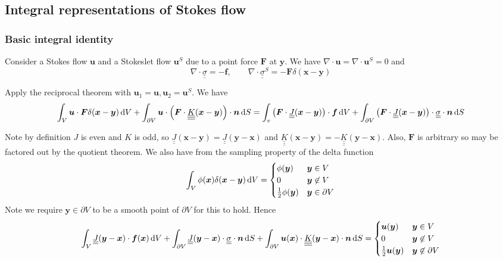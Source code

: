 \documentclass{jknotes}
\newcommand{\dunder}[1]{\underline{\underline{#1}}}
\newcommand{\x}{\bm{x}}
\renewcommand{\u}{\bm{u}}
\newcommand{\y}{\bm{y}}
\begin{document}
\subsection{Integral representations of Stokes flow}
\subsubsection{Basic integral identity}
Consider a Stokes flow $\u$ and a Stokeslet flow $\u^S$ due to a point force
$\bm{F}$ at $\y$. We have $\nabla \cdot \u = \nabla \cdot \u^S = 0$ and
\begin{equation}
	\nabla \cdot \dunder{\sigma} = -\bm{f}, \hspace{2em} \nabla \cdot
	\dunder{\sigma}^S = -\bm{F} \delta(\x-\y)
\end{equation}

Apply the reciprocal theorem with $\u_1 = \u, \u_2 = \u^S$. We have
\begin{equation}
	\int_V \u \cdot \bm{F} \delta(\x-\y) \, \diffd V + \int_{\partial V} \u
	\cdot \left( \bm{F} \cdot
		\dunder{\underline{K}}(\x-\y)\right)\cdot\bm{n}\,\diffd S = \int_v
		\left( \bm{F} \cdot \dunder{J}(\x-\y)\right) \cdot \bm{f} \, \diffd V
		+ \int_{\partial V} \left( \bm{F} \cdot
		\dunder{J}(\x-\y)\right)\cdot\dunder{\sigma}\cdot\bm{n}\,\diffd S
\end{equation}

Note by definition $J$ is even and $K$ is odd, so $\dunder{J}(\x-\y) =
\dunder{J}(\y-\x)$ and $\dunder{\underline{K}}(\x-\y) =
-\dunder{\underline{K}}(\y-\x)$. Also, $\bm{F}$ is arbitrary so may be
factored out by the quotient theorem. We also have from the sampling property
of the delta function
\begin{equation}
	\int_V \phi(\x) \delta(\x-\y)\,\diffd V = \begin{cases} \phi(\y) & \y \in
		V \\ 0 & \y \not\in V \\ \frac{1}{2}\phi(\y) & \y \in \partial V
	\end{cases}
\end{equation}
Note we require $\y\in\partial V$ to be a smooth point of $\partial V$ for
this to hold. Hence
\begin{equation}
	\int_V \dunder{J}(\y-\x)\cdot\bm{f}(\x)\,\diffd V + \int_{\partial V}
	\dunder{J}(\y-\x)\cdot\dunder{\sigma}\cdot\bm{n}\,\diffd S +
	\int_{\partial V}
	\u(\x)\cdot\dunder{\underline{K}}(\y-\x)\cdot\bm{n}\,\diffd S =
	\begin{cases}
		\u(\y) & \y \in V \\ 0 & \y\not\in V \\ \frac{1}{2} \u(\y) & \y
	\not\in \partial V \end{cases}
\end{equation}
\end{document}
